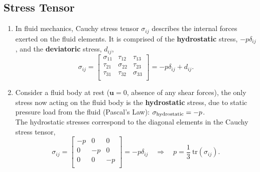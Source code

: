 \documentclass[a4paper]{article}
\begin{document}
\subsection{Stress Tensor}
\begin{minipage}{.7\textwidth}
\begin{enumerate}
    \item In fluid mechanics, Cauchy stress tensor $\sigma_{ij}$ describes the internal forces exerted on the fluid elements. It is comprised of the \textbf{hydrostatic} stress, $-p\delta_{ij}$, and the \textbf{deviatoric} stress, $d_{ij}$,
    \[
    \sigma_{ij} = 
        \begin{bmatrix}
        \sigma_{11} &   \tau_{12}   & \tau_{13} \\
        \tau_{21} &   \sigma_{22}   & \tau_{23} \\
        \tau_{31} &   \tau_{32}   & \sigma_{33} \\
        \end{bmatrix}
        = -p\delta_{ij} + d_{ij}.
    \]
    \item Consider a fluid body at rest ($\mathbf{u}=0$, absence of any shear forces), the only stress now acting on the fluid body is the \textbf{hydrostatic} stress, due to static pressure load from the fluid (Pascal's Law): $\sigma_{\rm hydrostatic} = -p$. \\
    
    The hydrostatic stresses correspond to the diagonal elements in the Cauchy stress tensor,
    \[
        \sigma_{ij} = 
        \begin{bmatrix}
        -p &   0   & 0 \\
        0 &   -p   & 0 \\
        0 &   0   & -p \\
        \end{bmatrix} = -p\delta_{ij} 
        \quad \Longrightarrow \quad 
        p = \frac{1}{3} \ \mathrm{tr}(\sigma_{ij}).
    \]
\end{enumerate}
\end{minipage}
\hfill
\end{document}
